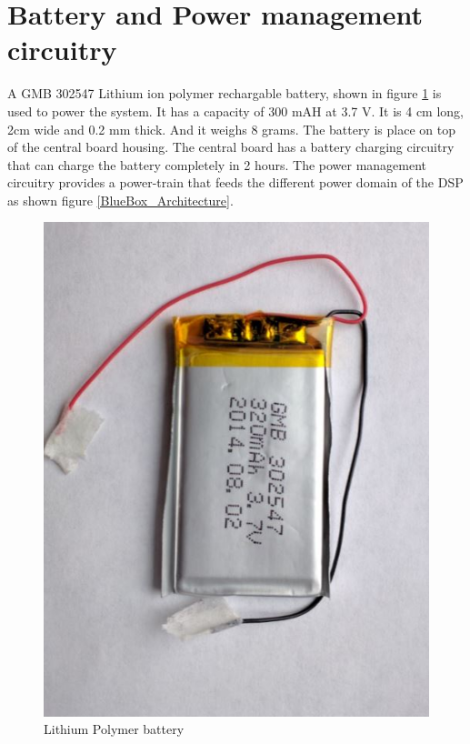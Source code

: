 \section{Battery and Power management circuitry}
 A GMB 302547 Lithium ion polymer rechargable battery, shown in figure \ref{fig:battery} is used to power the system. It has a capacity of 300 mAH at 3.7 V. It is 4 cm long, 2cm wide and 0.2 mm thick. And it weighs 8 grams. The battery is place on top of the central board housing. The central board has a battery charging circuitry that can charge the battery completely in 2 hours. The power management circuitry provides a power-train that feeds the different power domain of the DSP  as shown figure \ref{BlueBox_Architecture}.    
 \begin{figure}[h]
 	\centering
 	\includegraphics[scale = 0.25 ]{battery.JPG}
 	\caption{Lithium Polymer battery}\label{fig:battery}
 \end{figure}       
